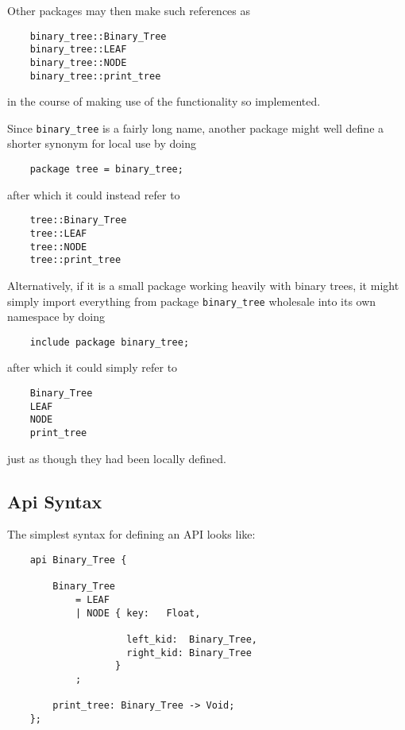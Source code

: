 Other packages may then make such references as

\begin{verbatim}
    binary_tree::Binary_Tree
    binary_tree::LEAF
    binary_tree::NODE
    binary_tree::print_tree
\end{verbatim}

in the course of making use of the functionality so implemented.

Since {\tt binary\_tree} is a fairly long name, another package might 
well define a shorter synonym for local use by doing

\begin{verbatim}
    package tree = binary_tree;
\end{verbatim}

after which it could instead refer to

\begin{verbatim}
    tree::Binary_Tree
    tree::LEAF
    tree::NODE
    tree::print_tree
\end{verbatim}

Alternatively, if it is a small package working heavily with binary trees, 
it might simply import everything from package {\tt binary\_tree} wholesale 
into its own namespace by doing

\begin{verbatim}
    include package binary_tree;
\end{verbatim}

after which it could simply refer to

\begin{verbatim}
    Binary_Tree
    LEAF
    NODE
    print_tree
\end{verbatim}

just as though they had been locally defined.


\cutend*

\subsection{Api Syntax}
\label{section:ref:api-syntax}

The simplest syntax for defining an API looks like:

\begin{verbatim}
    api Binary_Tree {

        Binary_Tree
            = LEAF
            | NODE { key:   Float,

                     left_kid:  Binary_Tree,
                     right_kid: Binary_Tree
                   }
            ;

        print_tree: Binary_Tree -> Void;
    };
\end{verbatim}

